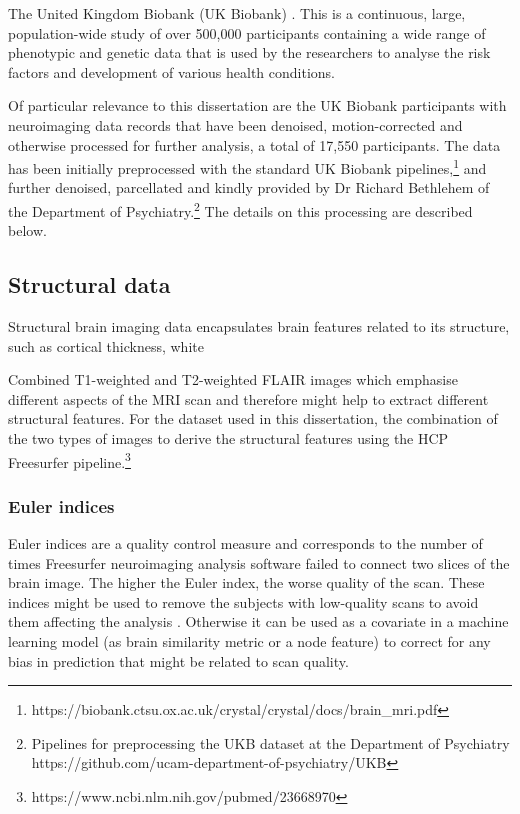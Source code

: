 The United Kingdom Biobank (UK Biobank) \cite{sudlow2015uk}. This is a continuous, large, population-wide study of over 500,000 participants containing a wide range of phenotypic and genetic data that is used by the researchers to analyse the risk factors and development of various health conditions. 

Of particular relevance to this dissertation are the UK Biobank participants with neuroimaging data records that have been denoised, motion-corrected and otherwise processed for further analysis, a total of 17,550 participants. The data has been initially preprocessed with the standard UK Biobank pipelines,\footnote{https://biobank.ctsu.ox.ac.uk/crystal/crystal/docs/brain_mri.pdf} and further denoised, parcellated and kindly provided by Dr Richard Bethlehem of the Department of Psychiatry.\footnote{Pipelines for preprocessing the UKB dataset at the Department of Psychiatry https://github.com/ucam-department-of-psychiatry/UKB} The details on this processing are described below.


\subsection{Structural data}
Structural brain imaging data encapsulates brain features related to its structure, such as cortical thickness, white 

Combined T1-weighted and T2-weighted FLAIR images which emphasise different aspects of the MRI scan and therefore might help to extract different structural features. For the dataset used in this dissertation, the combination of the two types of images to derive the structural features using the HCP Freesurfer pipeline.\footnote{https://www.ncbi.nlm.nih.gov/pubmed/23668970} 

\subsubsection{Euler indices}
Euler indices are a quality control measure and corresponds to the number of times Freesurfer neuroimaging analysis software failed to connect two slices of the brain image. The higher the Euler index, the worse quality of the scan. These indices might be used to remove the subjects with low-quality scans to avoid them affecting the analysis \cite{kaufmann2019}. Otherwise it can be used as a covariate in a machine learning model (as brain similarity metric or a node feature) to correct for any bias in prediction that might be related to scan quality.

